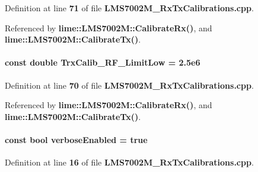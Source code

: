 Definition at line {\bf 71} of file {\bf L\+M\+S7002\+M\+\_\+\+Rx\+Tx\+Calibrations.\+cpp}.



Referenced by {\bf lime\+::\+L\+M\+S7002\+M\+::\+Calibrate\+Rx()}, and {\bf lime\+::\+L\+M\+S7002\+M\+::\+Calibrate\+Tx()}.

\paragraph[{Trx\+Calib\+\_\+\+R\+F\+\_\+\+Limit\+Low}]{\setlength{\rightskip}{0pt plus 5cm}const double Trx\+Calib\+\_\+\+R\+F\+\_\+\+Limit\+Low = 2.\+5e6}\label{LMS7002M__RxTxCalibrations_8cpp_a29cfe3bddb660912cc41353036598955}


Definition at line {\bf 70} of file {\bf L\+M\+S7002\+M\+\_\+\+Rx\+Tx\+Calibrations.\+cpp}.



Referenced by {\bf lime\+::\+L\+M\+S7002\+M\+::\+Calibrate\+Rx()}, and {\bf lime\+::\+L\+M\+S7002\+M\+::\+Calibrate\+Tx()}.

\paragraph[{verbose\+Enabled}]{\setlength{\rightskip}{0pt plus 5cm}const bool verbose\+Enabled = true\hspace{0.3cm}{\ttfamily [static]}}\label{LMS7002M__RxTxCalibrations_8cpp_ad5e1d28ffef8c9967c6eea67ece00a97}


Definition at line {\bf 16} of file {\bf L\+M\+S7002\+M\+\_\+\+Rx\+Tx\+Calibrations.\+cpp}.

